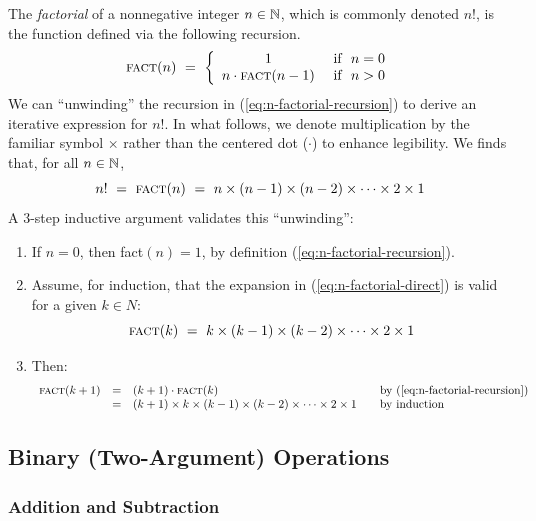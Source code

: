 The {\it factorial} of a nonnegative integer $n \in \mathbb{N}$, which is
commonly denoted $n!$,
is the function defined via the following recursion.
\begin{equation}
\label{eq:n-factorial-recursion}
\mbox{\sc fact}(n) \ = \ \left\{
\begin{array}{cl}
1 & \mbox{  if } \ n=0 \\
n \cdot \mbox{\sc fact}(n-1) & \mbox{  if } \ n>0
\end{array}
\right.
\end{equation}
We can ``unwinding'' the recursion in (\ref{eq:n-factorial-recursion})
to derive an iterative expression for $n!$.  In what follows, we
denote multiplication by the familiar symbol $\times$ rather than the
centered dot ($\cdot$) to enhance legibility.  We finds that, for all
$n \in \mathbb{N}$,
\begin{equation}
\label{eq:n-factorial-direct}
n! \ = \ \mbox{\sc fact}(n) \ = \ 
n \times (n-1) \times (n-2) \times \cdots \times 2 \times 1
\end{equation} 
A $3$-step inductive argument validates this ``unwinding'':
\begin{enumerate}
\item
If $n =0$, then {\sc fact}$(n) = 1$, by definition
(\ref{eq:n-factorial-recursion}).
\item
Assume, for induction, that the expansion in
(\ref{eq:n-factorial-direct}) is valid for a given $k \in N$:
\[ \mbox{\sc fact}(k) \ = \ k \times (k-1) \times (k-2) \times \cdots
\times 2 \times 1 \] 
\item
Then:
\[
\begin{array}{lclll}
\mbox{\sc fact}(k+1) & = & (k+1) \cdot \mbox{\sc fact}(k)
  & & \mbox{by (\ref{eq:n-factorial-recursion})} \\
  & = &
(k+1) \times k \times (k-1) \times (k-2) \times \cdots \times 2 \times 1
  & & \mbox{by induction}
\end{array}
\]
\end{enumerate}


\subsection{Binary (Two-Argument) Operations}
\label{sec:binary-operators}

\subsubsection{Addition and Subtraction}

